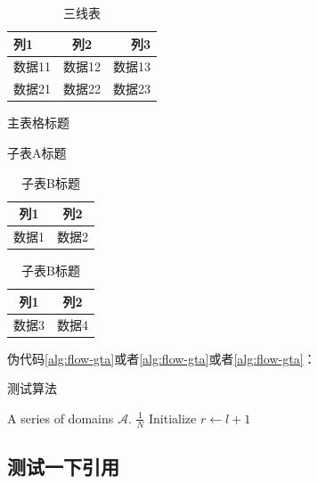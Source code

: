 \begin{table}[htbp]
    \centering
    \caption{三线表}
    \begin{tabularx}{0.8\linewidth}{LCR}
        \toprule
        列1   & 列2   & 列3   \\
        \midrule
        数据11 & 数据12 & 数据13 \\
        数据21 & 数据22 & 数据23 \\
        \bottomrule
    \end{tabularx}
    \label{tab:example2}
\end{table}

\begin{table}[htbp]
    \centering
    \caption{主表格标题}
    \begin{subtable}[t]{0.45\textwidth}
        \centering
        \caption{子表A标题}
        \label{tab:subtableA}
        \begin{tabular}{|c|c|}
            \hline
            列1 & 列2 \\ \hline
            数据1 & 数据2 \\ \hline
        \end{tabular}
    \end{subtable}
    \hfill
    \begin{subtable}[t]{0.45\textwidth}
        \centering
        \caption{子表B标题}
        \label{tab:subtableB}
        \begin{tabular}{|c|c|}
            \hline
            列1 & 列2 \\ \hline
            数据3 & 数据4 \\ \hline
        \end{tabular}
    \end{subtable}
\end{table}

伪代码\ref{alg:flow-gta}或者\cref{alg:flow-gta}或者\autoref{alg:flow-gta}：

\begin{algorithm}[h]
\caption{测试算法}
\label{alg:flow-gta}
\begin{algorithmic}[1]
\Input A series of domains $\mathcal{A}$.
\Output $\frac{1}{N}$ 
\STATE Initialize
    \STATE $r \gets l + 1$
\ENDFOR
\end{algorithmic}
\end{algorithm}

\subsection{测试一下引用}

